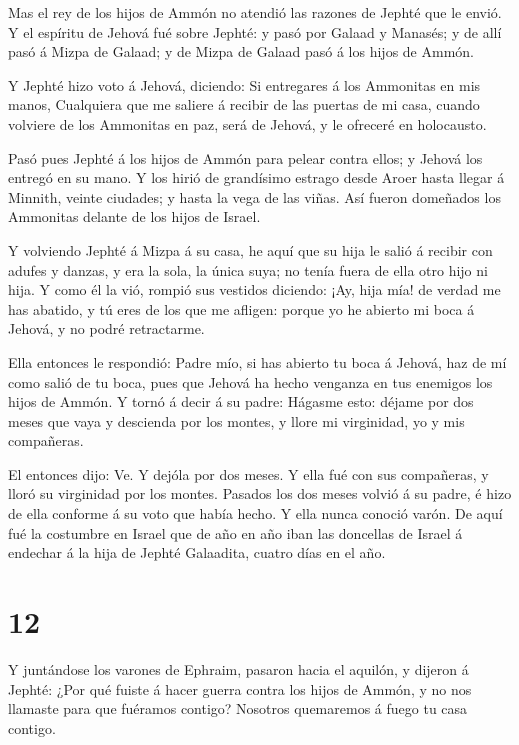  Mas el rey de los hijos de Ammón no atendió las razones de
Jephté que le envió.  Y el espíritu de Jehová fué sobre
Jephté: y pasó por Galaad y Manasés; y de allí pasó á Mizpa de Galaad; y
de Mizpa de Galaad pasó á los hijos de Ammón.

 Y Jephté hizo voto á Jehová, diciendo: Si entregares á los
Ammonitas en mis manos,  Cualquiera que me saliere á
recibir de las puertas de mi casa, cuando volviere de los Ammonitas en
paz, será de Jehová, y le ofreceré en holocausto.

 Pasó pues Jephté á los hijos de Ammón para pelear contra
ellos; y Jehová los entregó en su mano.  Y los hirió de
grandísimo estrago desde Aroer hasta llegar á Minnith, veinte ciudades;
y hasta la vega de las viñas. Así fueron domeñados los Ammonitas delante
de los hijos de Israel.

 Y volviendo Jephté á Mizpa á su casa, he aquí que su hija
le salió á recibir con adufes y danzas, y era la sola, la única suya; no
tenía fuera de ella otro hijo ni hija.  Y como él la vió,
rompió sus vestidos diciendo: ¡Ay, hija mía! de verdad me has abatido, y
tú eres de los que me afligen: porque yo he abierto mi boca á Jehová, y
no podré retractarme.

 Ella entonces le respondió: Padre mío, si has abierto tu
boca á Jehová, haz de mí como salió de tu boca, pues que Jehová ha hecho
venganza en tus enemigos los hijos de Ammón.  Y tornó á
decir á su padre: Hágasme esto: déjame por dos meses que vaya y
descienda por los montes, y llore mi virginidad, yo y mis compañeras.

 El entonces dijo: Ve. Y dejóla por dos meses. Y ella fué
con sus compañeras, y lloró su virginidad por los montes. 
Pasados los dos meses volvió á su padre, é hizo de ella conforme á su
voto que había hecho. Y ella nunca conoció varón.  De aquí
fué la costumbre en Israel que de año en año iban las doncellas de
Israel á endechar á la hija de Jephté Galaadita, cuatro días en el año.

\hypertarget{section-11}{%
\section{12}\label{section-11}}

 Y juntándose los varones de Ephraim, pasaron hacia el
aquilón, y dijeron á Jephté: ¿Por qué fuiste á hacer guerra contra los
hijos de Ammón, y no nos llamaste para que fuéramos contigo? Nosotros
quemaremos á fuego tu casa contigo.

